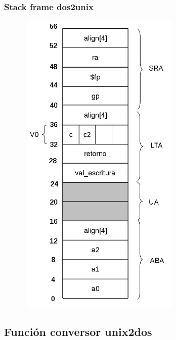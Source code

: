 \documentclass[a4paper,10pt]{article}
\begin{document}
    \subsubsection{Stack frame dos2unix}
      \begin{center}
	\includegraphics[width=10cm, height=15cm]{DibujosStackFrame/stack-conversor-dos2unix.jpg}
      \end{center}

  \subsection{Funci\'on conversor unix2dos}
\end{document}
